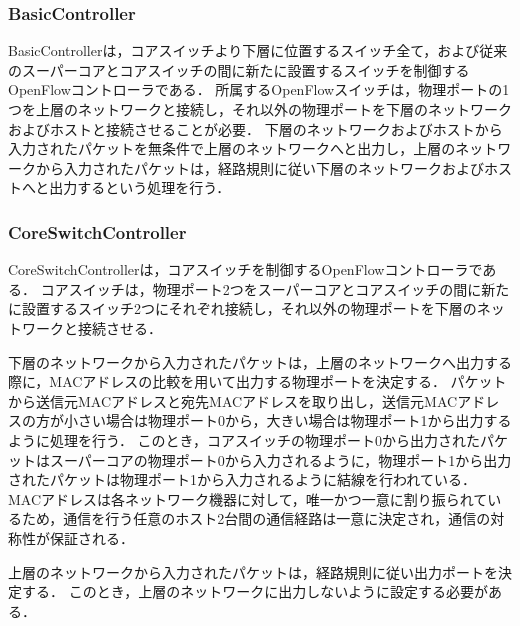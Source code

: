 \subsubsection{BasicController}

BasicControllerは，コアスイッチより下層に位置するスイッチ全て，および従来のスーパーコアとコアスイッチの間に新たに設置するスイッチを制御するOpenFlowコントローラである．
所属するOpenFlowスイッチは，物理ポートの1つを上層のネットワークと接続し，それ以外の物理ポートを下層のネットワークおよびホストと接続させることが必要．
下層のネットワークおよびホストから入力されたパケットを無条件で上層のネットワークへと出力し，上層のネットワークから入力されたパケットは，経路規則に従い下層のネットワークおよびホストへと出力するという処理を行う．

\subsubsection{CoreSwitchController}

CoreSwitchControllerは，コアスイッチを制御するOpenFlowコントローラである．
コアスイッチは，物理ポート2つをスーパーコアとコアスイッチの間に新たに設置するスイッチ2つにそれぞれ接続し，それ以外の物理ポートを下層のネットワークと接続させる．

下層のネットワークから入力されたパケットは，上層のネットワークへ出力する際に，MACアドレスの比較を用いて出力する物理ポートを決定する．
パケットから送信元MACアドレスと宛先MACアドレスを取り出し，送信元MACアドレスの方が小さい場合は物理ポート0から，大きい場合は物理ポート1から出力するように処理を行う．
このとき，コアスイッチの物理ポート0から出力されたパケットはスーパーコアの物理ポート0から入力されるように，物理ポート1から出力されたパケットは物理ポート1から入力されるように結線を行われている．
MACアドレスは各ネットワーク機器に対して，唯一かつ一意に割り振られているため，通信を行う任意のホスト2台間の通信経路は一意に決定され，通信の対称性が保証される．

上層のネットワークから入力されたパケットは，経路規則に従い出力ポートを決定する．
このとき，上層のネットワークに出力しないように設定する必要がある．